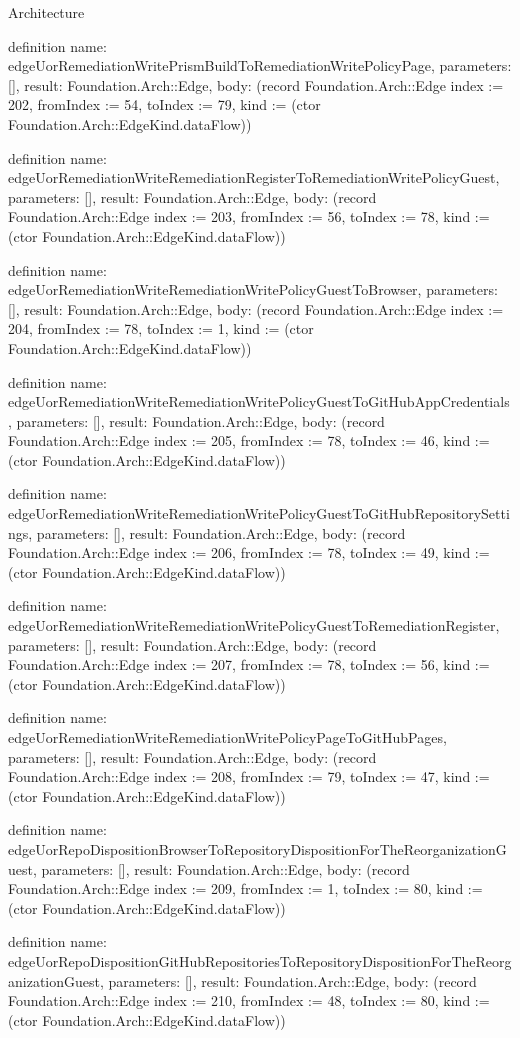 \begin{lexlean}{Architecture}
\begin{semanticmodule}
definition{
  name: edgeUorRemediationWritePrismBuildToRemediationWritePolicyPage,
  parameters: [],
  result: Foundation.Arch::Edge,
  body: (record Foundation.Arch::Edge {index := 202, fromIndex := 54, toIndex := 79, kind := (ctor Foundation.Arch::EdgeKind.dataFlow)})
}

definition{
  name: edgeUorRemediationWriteRemediationRegisterToRemediationWritePolicyGuest,
  parameters: [],
  result: Foundation.Arch::Edge,
  body: (record Foundation.Arch::Edge {index := 203, fromIndex := 56, toIndex := 78, kind := (ctor Foundation.Arch::EdgeKind.dataFlow)})
}

definition{
  name: edgeUorRemediationWriteRemediationWritePolicyGuestToBrowser,
  parameters: [],
  result: Foundation.Arch::Edge,
  body: (record Foundation.Arch::Edge {index := 204, fromIndex := 78, toIndex := 1, kind := (ctor Foundation.Arch::EdgeKind.dataFlow)})
}

definition{
  name: edgeUorRemediationWriteRemediationWritePolicyGuestToGitHubAppCredentials,
  parameters: [],
  result: Foundation.Arch::Edge,
  body: (record Foundation.Arch::Edge {index := 205, fromIndex := 78, toIndex := 46, kind := (ctor Foundation.Arch::EdgeKind.dataFlow)})
}

definition{
  name: edgeUorRemediationWriteRemediationWritePolicyGuestToGitHubRepositorySettings,
  parameters: [],
  result: Foundation.Arch::Edge,
  body: (record Foundation.Arch::Edge {index := 206, fromIndex := 78, toIndex := 49, kind := (ctor Foundation.Arch::EdgeKind.dataFlow)})
}

definition{
  name: edgeUorRemediationWriteRemediationWritePolicyGuestToRemediationRegister,
  parameters: [],
  result: Foundation.Arch::Edge,
  body: (record Foundation.Arch::Edge {index := 207, fromIndex := 78, toIndex := 56, kind := (ctor Foundation.Arch::EdgeKind.dataFlow)})
}

definition{
  name: edgeUorRemediationWriteRemediationWritePolicyPageToGitHubPages,
  parameters: [],
  result: Foundation.Arch::Edge,
  body: (record Foundation.Arch::Edge {index := 208, fromIndex := 79, toIndex := 47, kind := (ctor Foundation.Arch::EdgeKind.dataFlow)})
}

definition{
  name: edgeUorRepoDispositionBrowserToRepositoryDispositionForTheReorganizationGuest,
  parameters: [],
  result: Foundation.Arch::Edge,
  body: (record Foundation.Arch::Edge {index := 209, fromIndex := 1, toIndex := 80, kind := (ctor Foundation.Arch::EdgeKind.dataFlow)})
}

definition{
  name: edgeUorRepoDispositionGitHubRepositoriesToRepositoryDispositionForTheReorganizationGuest,
  parameters: [],
  result: Foundation.Arch::Edge,
  body: (record Foundation.Arch::Edge {index := 210, fromIndex := 48, toIndex := 80, kind := (ctor Foundation.Arch::EdgeKind.dataFlow)})
}


\end{semanticmodule}
\end{lexlean}
